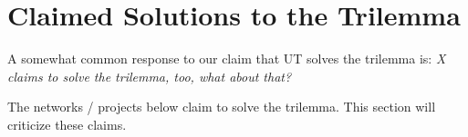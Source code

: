 \section{Claimed Solutions to the Trilemma}

\label{sec:claimed-trilemma-solns}

A somewhat common response to our claim that UT solves the trilemma is: \emph{X claims to solve the trilemma, too, what about that?}

The networks / projects below claim to solve the trilemma.
This section will criticize these claims.





% 

